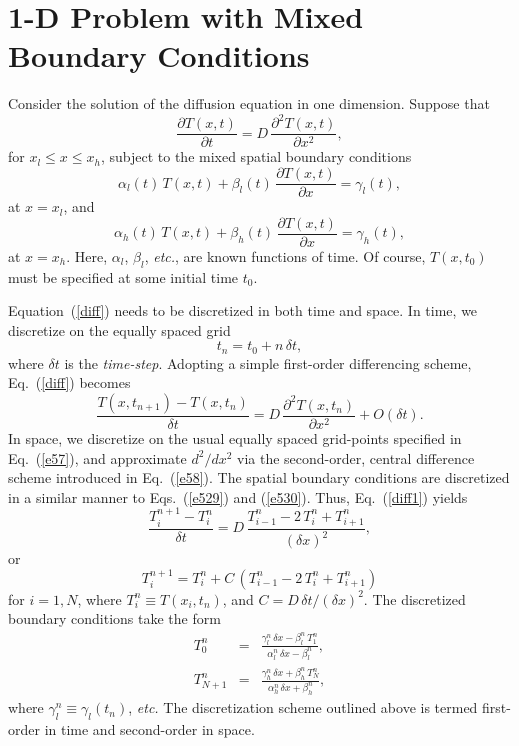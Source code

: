 \section{1-D Problem with Mixed Boundary Conditions}
Consider the solution of the diffusion equation in one dimension.
Suppose that
\begin{equation}\label{diff}
\frac{\partial T(x,t)}{\partial t} = D\,\frac{\partial^2 T(x,t)}{\partial x^2},
\end{equation}
for $x_l\leq x\leq x_h$, subject to the mixed spatial boundary conditions
\begin{equation}
\alpha_l(t)\,T(x,t) + \beta_l(t)\,\frac{\partial T(x,t)}{\partial x} = \gamma_l(t),
\end{equation}
at $x=x_l$, and
\begin{equation}
\alpha_h(t) \,T(x,t)+ \beta_h(t)\,\frac{\partial  T(x,t)}{\partial x} = \gamma_h(t),
\end{equation}
at $x=x_h$. Here, $\alpha_l$, $\beta_l$, {\em etc.}, are known functions of time.
Of course, $T(x,t_0)$ must be specified at some initial time $t_0$.

Equation~(\ref{diff}) needs to be discretized in both time and space.
In time, we  discretize
on the equally spaced grid
\begin{equation}
t_n = t_0 + n\,\delta t,
\end{equation}
where $\delta t$ is the {\em time-step}. Adopting a
simple first-order differencing scheme, Eq.~(\ref{diff}) becomes
\begin{equation}\label{diff1}
\frac{T(x,t_{n+1}) - T(x,t_n)}{\delta t} 
= D \,\frac{\partial^2 T(x,t_n)}{\partial x^2}+ O(\delta t).
\end{equation}
 In space,
we discretize on the usual equally spaced grid-points specified in Eq.~(\ref{e57}),
and approximate $d^2/dx^2$ via the second-order, central difference scheme
introduced in Eq.~(\ref{e58}). The spatial boundary conditions are discretized in a similar
manner to Eqs.~(\ref{e529}) and (\ref{e530}). Thus, Eq.~(\ref{diff1}) yields
\begin{equation}
\frac{T_i^{n+1}-T_i^n}{\delta t} = D\,\frac{T_{i-1}^n-2\,T_i^n+T_{i+1}^n}{(\delta x)^2},
\end{equation}
or 
\begin{equation}\label{diff2}
T_i^{n+1} = T_i^n + C\,\left(T_{i-1}^n-2\,T_i^n+T_{i+1}^n\right)
\end{equation}
for $i=1,N$, where $T_i^n \equiv T(x_i,t_n)$, and $C= D\,\delta t/(\delta x)^2$. 
The discretized boundary conditions take the form
\begin{eqnarray}
T_0^n &=& \frac{\gamma_l^n\,\delta x-\beta_l^n\,T_1^n}{\alpha_l^n\,\delta x -\beta_l^n},\\[0.5ex]
T_{N+1}^n &=& \frac{\gamma_h^n\,\delta x + \beta_h^n\,T_N^n}{\alpha_h^n\,\delta x +\beta_h^n},\label{diff3}
\end{eqnarray}
where $\gamma_l^n\equiv \gamma_l(t_n)$, {\em etc.} The discretization scheme outlined above
is termed first-order in time and second-order in space.

